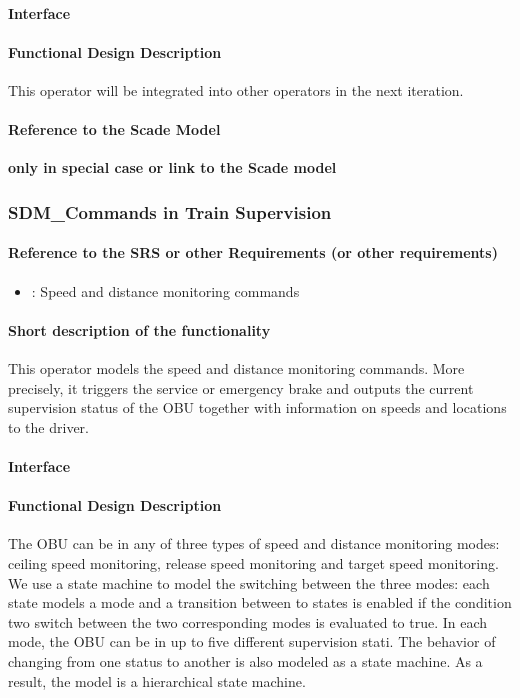 \paragraph{Interface}
\paragraph{Functional Design Description}
This operator will be integrated into other operators in the next iteration.
\paragraph{Reference to the Scade Model}
\textbf{only in special case or link to the Scade model}

\subsubsection{SDM\_Commands in Train Supervision}
\paragraph{Reference to the SRS or other Requirements (or other requirements)}
\begin{itemize}
	\item \cite[Chapt.~3.13.10]{subset-026}: Speed and distance monitoring commands 
\end{itemize}
\paragraph{Short description of the functionality}
This operator models the speed and distance monitoring commands. More precisely, it triggers the service or emergency brake and outputs the current supervision status of the OBU together with information on speeds and locations to the driver.
\paragraph{Interface}
\paragraph{Functional Design Description}
The OBU can be in any of three types of speed and distance monitoring modes: ceiling speed monitoring, release speed monitoring and target speed monitoring. We use a state machine to model the switching between the three modes: each state models a mode and a transition between to states is enabled if the condition two switch between the two corresponding modes is evaluated to true. In each mode, the OBU can be in up to five different supervision stati. The behavior of changing from one status to another is also modeled as a state machine. As a result, the model is a hierarchical state machine.
